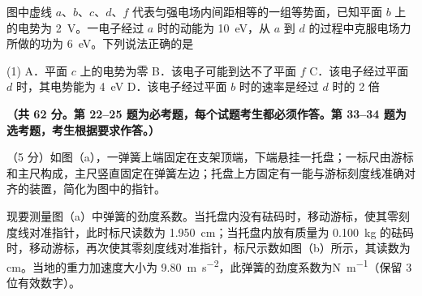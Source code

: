 \begin{question}
图中虚线 $a$、$b$、$c$、$d$、$f$ 代表匀强电场内间距相等的一组等势面，已知平面 $b$ 上的电势为 \SI{2}{\volt}。一电子经过 $a$ 时的动能为 \SI{10}{eV}，从 $a$ 到 $d$ 的过程中克服电场力所做的功为 \SI{6}{eV}。下列说法正确的是\gkblank


\begin{gkopts}(1)
  \task A．平面 $c$ 上的电势为零
  \task B．该电子可能到达不了平面 $f$
  \task C．该电子经过平面 $d$ 时，其电势能为 \SI{4}{eV}
  \task D．该电子经过平面 $b$ 时的速率是经过 $d$ 时的 2 倍
\end{gkopts}
\end{question}


\textbf{（共 62 分。第 22--25 题为必考题，每个试题考生都必须作答。第 33--34 题为选考题，考生根据要求作答。）}


\begin{question}
（5 分）如图（a），一弹簧上端固定在支架顶端，下端悬挂一托盘；一标尺由游标和主尺构成，主尺竖直固定在弹簧左边；托盘上方固定有一能与游标刻度线准确对齐的装置，简化为图中的指针。

现要测量图（a）中弹簧的劲度系数。当托盘内没有砝码时，移动游标，使其零刻度线对准指针，此时标尺读数为 \SI{1.950}{\centi\metre}；当托盘内放有质量为 \SI{0.100}{\kilogram} 的砝码时，移动游标，再次使其零刻度线对准指针，标尺示数如图（b）所示，其读数为\gkblank \si{\centi\metre}。当地的重力加速度大小为 \SI{9.80}{\metre\per\second\squared}，此弹簧的劲度系数为\gkblank \si{\newton\per\metre}（保留 3 位有效数字）。

\end{question}

